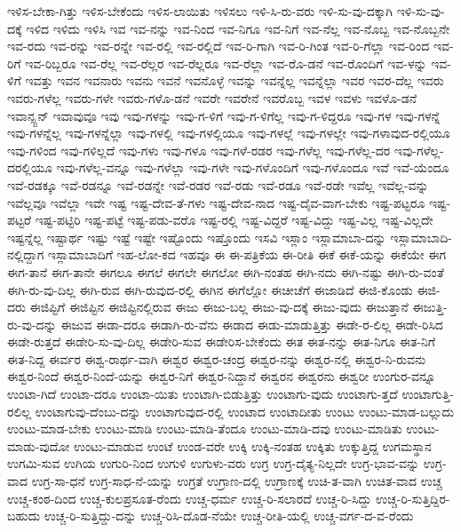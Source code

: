{ಇಳಿಸ-ಬೇಕಾ-ಗಿತ್ತು
ಇಳಿಸ-ಬೇಕೆಂದು
ಇಳಿಸ-ಲಾಯಿತು
ಇಳಿಸಲು
ಇಳಿ-ಸಿ-ರು-ವರು
ಇಳಿ-ಸು-ವು-ದಕ್ಕಾಗಿ
ಇಳಿ-ಸು-ವು-ದಕ್ಕೆ
ಇಳಿದ
ಇಳಿದು
ಇಳಿಸಿ
ಇವ
ಇವ-ನನ್ನು
ಇವ-ನಿಂದ
ಇವ-ನಿಗೂ
ಇವ-ನಿಗೆ
ಇವ-ನೆಲ್ಲ
ಇವ-ನೊಬ್ಬ
ಇವ-ನೊಬ್ಬನೇ
ಇವ-ರದು
ಇವ-ರನ್ನು
ಇವ-ರನ್ನೇ
ಇವ-ರಲ್ಲಿ
ಇವ-ರಲ್ಲಿದೆ
ಇವ-ರಿ-ಗಾಗಿ
ಇವ-ರಿ-ಗಿಂತ
ಇವ-ರಿ-ಗೆಲ್ಲಾ
ಇವ-ರಿಂದ
ಇವ-ರಿಗೆ
ಇವ-ರಿಬ್ಬರೂ
ಇವ-ರೆಲ್ಲ
ಇವ-ರೆಲ್ಲರ
ಇವ-ರೆಲ್ಲರೂ
ಇವ-ರೆಲ್ಲಾ
ಇವ-ರೊ-ಡನೆ
ಇವ-ರೊಂದಿಗೆ
ಇವ-ಳನ್ನು
ಇವ-ಳಿಗೆ
ಇವತ್ತು
ಇವನ
ಇವನಾರು
ಇವನು
ಇವನೆ
ಇವನೊಳ್ಳೆ
ಇವನ್ನು
ಇವನ್ನೆಲ್ಲ
ಇವನ್ನೆಲ್ಲಾ
ಇವರ
ಇವರ-ದೆಲ್ಲ
ಇವರು
ಇವರು-ಗಳೆಲ್ಲ
ಇವರು-ಗಳೇ
ಇವರು-ಗಳೊ-ಡನೆ
ಇವರೇ
ಇವರೇನೆ
ಇವರೊಬ್ಬ
ಇವಳ
ಇವಳು
ಇವಳೊ-ಡನೆ
ಇವಾನ್ಸ್ಟನ್
ಇವಾವುವೂ
ಇವು
ಇವು-ಗಳನ್ನು
ಇವು-ಗ-ಳಿಗೆ
ಇವು-ಗ-ಳಿಗೆಲ್ಲ
ಇವು-ಗ-ಳಿದ್ದರೂ
ಇವು-ಗಳ
ಇವು-ಗಳನ್ನೆ
ಇವು-ಗಳನ್ನೆಲ್ಲ
ಇವು-ಗಳನ್ನೆಲ್ಲಾ
ಇವು-ಗಳಲ್ಲಿ
ಇವು-ಗಳಲ್ಲಿಯೂ
ಇವು-ಗಳಲ್ಲೆ
ಇವು-ಗಳಲ್ಲೇ
ಇವು-ಗಳಾವುದ-ರಲ್ಲಿಯೂ
ಇವು-ಗಳಿಂದ
ಇವು-ಗಳಿಲ್ಲದೆ
ಇವು-ಗಳು
ಇವು-ಗಳೂ
ಇವು-ಗಳೆ-ರಡರ
ಇವು-ಗಳೆಲ್ಲ
ಇವು-ಗಳೆಲ್ಲ-ದರ
ಇವು-ಗಳೆಲ್ಲ-ದರಲ್ಲಿಯೂ
ಇವು-ಗಳೆಲ್ಲ-ವನ್ನೂ
ಇವು-ಗಳೆಲ್ಲಾ
ಇವು-ಗಳೇ
ಇವು-ಗಳೊಂದಿಗೆ
ಇವು-ಗಳೊಂದೂ
ಇವೆ
ಇವೆ-ಯೆಂದೂ
ಇವೆ-ರಡಕ್ಕೂ
ಇವೆ-ರಡನ್ನೂ
ಇವೆ-ರಡನ್ನೇ
ಇವೆ-ರಡರ
ಇವೆ-ರಡು
ಇವೆ-ರಡೂ
ಇವೆ-ರಡೇ
ಇವೆಲ್ಲ
ಇವೆಲ್ಲ-ವನ್ನು
ಇವೆಲ್ಲವೂ
ಇವೆಲ್ಲಾ
ಇವೇ
ಇಷ್ಟ
ಇಷ್ಟ-ದೇವ-ತೆ-ಗಳು
ಇಷ್ಟ-ದೇವ-ನಾದ
ಇಷ್ಟ-ದೈವ-ವಾಗ-ಬೇಕು
ಇಷ್ಟ-ಪಟ್ಟರೂ
ಇಷ್ಟ-ಪಟ್ಟರೆ
ಇಷ್ಟ-ಪಟ್ಟಿರಿ
ಇಷ್ಟ-ಪಟ್ಟೆ
ಇಷ್ಟ-ಪಡು-ವರೊ
ಇಷ್ಟ-ರಲ್ಲಿ
ಇಷ್ಟ-ವಿದ್ದರೆ
ಇಷ್ಟ-ವಿದ್ದು
ಇಷ್ಟ-ವಿಲ್ಲ
ಇಷ್ಟ-ವಿಲ್ಲದೇ
ಇಷ್ಟನ್ನೆಲ್ಲ
ಇಷ್ಟಾರ್ಥ
ಇಷ್ಟು
ಇಷ್ಟೆ
ಇಷ್ಟೇ
ಇಷ್ಟೊಂದು
ಇಷ್ತೊಂದು
ಇಸವಿ
ಇಸ್ಲಾಂ
ಇಸ್ಲಾಮಾಬಾ-ದನ್ನು
ಇಸ್ಲಾಮಾಬಾದಿ-ನಲ್ಲಿದ್ದಾಗ
ಇಸ್ಲಾಮಾಬಾದಿಗೆ
ಇಹ-ಲೋ-ಕದ
ಇಹವೂ
ಈ
ಈ-ಪತ್ರಿಕೆಯ
ಈ-ರೀತಿ
ಈಕೆ
ಈಕೆ-ಯನ್ನು
ಈಕೆಯೇ
ಈಗ
ಈಗ-ತಾನೆ
ಈಗ-ತಾನೇ
ಈಗಲೂ
ಈಗಲೆ
ಈಗಲೇ
ಈಗಲೋ
ಈಗಿ-ನಂತಹ
ಈಗಿ-ನದು
ಈಗಿ-ನಷ್ಟು
ಈಗಿ-ರು-ವಂತೆ
ಈಗಿ-ರು-ವು-ದಿಲ್ಲ
ಈಗಿ-ರುವ
ಈಗಿ-ರುವುದ-ರಲ್ಲಿ
ಈಗಿನ
ಈಗೆಲ್ಲೋ
ಈಚೀಚೆಗೆ
ಈಜಾಡಿದೆ
ಈಜಿ-ಕೊಂಡು
ಈಜಿ-ದರು
ಈಜಿಪ್ಟಿಗೆ
ಈಜಿಪ್ಟಿನ
ಈಜಿಪ್ಟಿನಲ್ಲಿರುವ
ಈಜು
ಈಜು-ಬಲ್ಲ
ಈಜು-ವು-ದಕ್ಕೆ
ಈಜು-ವುದು
ಈಜುತ್ತಾನೆ
ಈಜುತ್ತಿ-ರು-ವು-ದನ್ನು
ಈಜುವ
ಈಡಾ-ದರೂ
ಈಡಾಗಿ-ರು-ವೆನು
ಈಡಾದ
ಈಡು-ಮಾಡುತ್ತಿತ್ತು
ಈಡೇ-ರ-ಲಿಲ್ಲ
ಈಡೇ-ರಿಸಿದ
ಈಡೇ-ರುತ್ತದೆ
ಈಡೇರಿ-ಸು-ವು-ದಿಲ್ಲ
ಈಡೇರಿ-ಸುವ
ಈಡೇರಿಸ-ಬೇಕೆಂದು
ಈತ
ಈತ-ನನ್ನು
ಈತ-ನಿಗೂ
ಈತ-ನಿಗೆ
ಈತ-ನಿದ್ದ
ಈರ್ವರ
ಈಶ್ವ-ರಾರ್ಥ-ವಾಗಿ
ಈಶ್ವರ
ಈಶ್ವರ-ಚಂದ್ರ
ಈಶ್ವರ-ನನ್ನು
ಈಶ್ವರ-ನಲ್ಲಿ
ಈಶ್ವರ-ನಿ-ರುವನು
ಈಶ್ವರ-ನಿಂದೆ
ಈಶ್ವರ-ನಿಂದೆ-ಯನ್ನು
ಈಶ್ವರ-ನಿಗೆ
ಈಶ್ವರ-ನಿದ್ದಾನೆ
ಈಶ್ವರನ
ಈಶ್ವರನು
ಈಶ್ವರೀ
ಉಂಗುರ-ವನ್ನೂ
ಉಂಟಾ-ಗಿದೆ
ಉಂಟಾ-ದರೂ
ಉಂಟಾ-ಯಿತು
ಉಂಟಾಗಿ-ಬಿಡುತ್ತಿತ್ತು
ಉಂಟಾಗು-ವುದು
ಉಂಟಾಗು-ತ್ತದೆ
ಉಂಟಾಗುತ್ತಿ-ರಲಿಲ್ಲ
ಉಂಟಾಗುವು-ದೆಂಬು-ದನ್ನು
ಉಂಟಾಗುವುದ-ರಲ್ಲಿ
ಉಂಟಾದ
ಉಂಟಾದೀತು
ಉಂಟು
ಉಂಟು-ಮಾಡ-ಬಲ್ಲುದು
ಉಂಟು-ಮಾಡ-ಬೇಕು
ಉಂಟು-ಮಾಡಿ
ಉಂಟು-ಮಾಡಿ-ತೆಂದೂ
ಉಂಟು-ಮಾಡಿ-ದವು
ಉಂಟು-ಮಾಡಿತು
ಉಂಟು-ಮಾಡು-ವುದೋ
ಉಂಟು-ಮಾಡುವ
ಉಂಟೆ
ಉಂಡ-ವರೇ
ಉಕ್ಕಿ
ಉಕ್ಕಿ-ನಂತಹ
ಉಕ್ಕಿತು
ಉಕ್ಕುತ್ತಿದ್ದ
ಉಗಮಸ್ಥಾನ
ಉಗಮಿ-ಸುವ
ಉಗಿಯ
ಉಗುರಿ-ನಿಂದ
ಉಗುಳಿ
ಉಗುಳು-ವರು
ಉಗ್ರ
ಉಗ್ರ-ದೈತ್ಯ-ನಿಲ್ಲದೇ
ಉಗ್ರ-ಭಾವ-ವನ್ನು
ಉಗ್ರ-ವಾದ
ಉಗ್ರ-ಸಾ-ಧನೆ
ಉಗ್ರ-ಸಾಧ-ನೆ-ಯನ್ನು
ಉಗ್ರತೆ
ಉಗ್ರಾಣ-ದಲ್ಲಿ
ಉಗ್ರಾಣಕ್ಕೆ
ಉಚಿ-ತ-ವಾಗಿ
ಉಚಿತ-ವಾದ
ಉಚ್ಚ
ಉಚ್ಚ-ಕಂಠ-ದಿಂದ
ಉಚ್ಚ-ಕುಲಪ್ರಸೂತ-ರೆಂದು
ಉಚ್ಚ-ಧರ್ಮ
ಉಚ್ಚ-ರಿ-ಸಲಾರದೆ
ಉಚ್ಚ-ರಿ-ಸಿದ್ದು
ಉಚ್ಚ-ರಿ-ಸುತ್ತಿದ್ದಿರ-ಬಹುದು
ಉಚ್ಚ-ರಿ-ಸುತ್ತಿದ್ದು-ದನ್ನು
ಉಚ್ಚ-ರಿಸಿ-ದೊಡ-ನೆಯೇ
ಉಚ್ಚ-ರೀತಿ-ಯಲ್ಲಿ
ಉಚ್ಚ-ವರ್ಗ-ದ-ವ-ರೆಂದು
}
